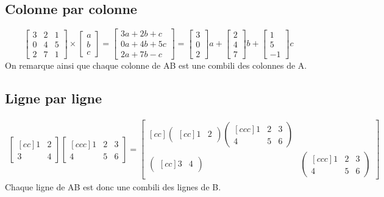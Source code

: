 \documentclass[a4paper]{book}
\begin{document}
\subsection{Colonne par colonne}
\begin{equation}
    \begin{bmatrix}
    3&2&1 \\
    0&4&5\\
    2&7&1
    \end{bmatrix}
    \times
    \begin{bmatrix}
    a\\b\\c
    \end{bmatrix}
    =
    \begin{bmatrix}
    3a+2b+c\\
    0a+4b+5c\\
    2a+7b-c
    \end{bmatrix}
    =
    \begin{bmatrix}
    3\\0\\2
    \end{bmatrix} a +
    \begin{bmatrix}
    2\\4\\7
    \end{bmatrix} b +
    \begin{bmatrix}
    1\\5\\-1
    \end{bmatrix} c
\end{equation}
On remarque ainsi que chaque colonne de AB est une combili des colonnes de A.
\subsection{Ligne par ligne}
\begin{gather}
    \begin{bmatrix}[cc]
    1&2\\3&4
    \end{bmatrix}
    \begin{bmatrix}[ccc]
    1&2&3\\4&5&6
    \end{bmatrix} =
    \begin{bmatrix}[cc]
        \begin{pmatrix}[cc]
        1&2
        \end{pmatrix}
        \begin{pmatrix}[ccc]
        1&2&3 \\ 4&5&6
        \end{pmatrix} \\
        \begin{pmatrix}[cc]
        3&4
        \end{pmatrix} &
        \begin{pmatrix}[ccc]
        1&2&3 \\ 4&5&6
        \end{pmatrix}
    \end{bmatrix}
\end{gather}
Chaque ligne de AB est donc une combili des lignes de B.
\end{document}
